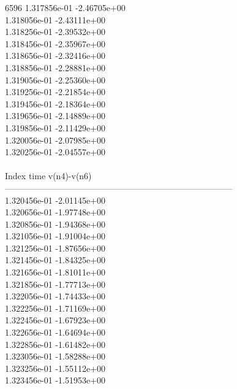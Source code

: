 6596	1.317856e-01	-2.46705e+00	\\ 	1.318056e-01	-2.43111e+00	\\ 	1.318256e-01	-2.39532e+00	\\ 	1.318456e-01	-2.35967e+00	\\ 	1.318656e-01	-2.32416e+00	\\ 	1.318856e-01	-2.28881e+00	\\ 	1.319056e-01	-2.25360e+00	\\ 	1.319256e-01	-2.21854e+00	\\ 	1.319456e-01	-2.18364e+00	\\ 	1.319656e-01	-2.14889e+00	\\ 	1.319856e-01	-2.11429e+00	\\ 	1.320056e-01	-2.07985e+00	\\ 	1.320256e-01	-2.04557e+00	\\ \hline
\\ \hline
Index   time            v(n4)-v(n6)     \\ \hline
--------------------------------------------------------------------------------\\ 	1.320456e-01	-2.01145e+00	\\ 	1.320656e-01	-1.97748e+00	\\ 	1.320856e-01	-1.94368e+00	\\ 	1.321056e-01	-1.91004e+00	\\ 	1.321256e-01	-1.87656e+00	\\ 	1.321456e-01	-1.84325e+00	\\ 	1.321656e-01	-1.81011e+00	\\ 	1.321856e-01	-1.77713e+00	\\ 	1.322056e-01	-1.74433e+00	\\ 	1.322256e-01	-1.71169e+00	\\ 	1.322456e-01	-1.67923e+00	\\ 	1.322656e-01	-1.64694e+00	\\ 	1.322856e-01	-1.61482e+00	\\ 	1.323056e-01	-1.58288e+00	\\ 	1.323256e-01	-1.55112e+00	\\ 	1.323456e-01	-1.51953e+00	\\ \hline
